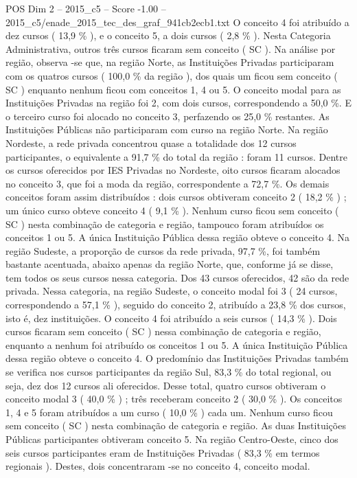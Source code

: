\begin{textsample}{POS Dim 2 – 2015\_c5 – Score -1.00 – 2015\_c5/enade\_2015\_tec\_des\_graf\_941cb2ecb1.txt}
O conceito 4 foi atribuído a dez cursos ( 13,9 \% ), e o conceito 5, a dois cursos ( 2,8 \% ).
Nesta Categoria Administrativa, outros três cursos ficaram sem conceito ( SC ).
Na análise por região, observa -se que, na região Norte, as Instituições Privadas participaram com os quatros cursos ( 100,0 \% da região ), dos quais um ficou sem conceito ( SC ) enquanto nenhum ficou com conceitos 1, 4 ou 5.
O conceito modal para as Instituições Privadas na região foi 2, com dois cursos, correspondendo a 50,0 \%.
E o terceiro curso foi alocado no conceito 3, perfazendo os 25,0 \% restantes.
As Instituições Públicas não participaram com curso na região Norte.
Na região Nordeste, a rede privada concentrou quase a totalidade dos 12 cursos participantes, o equivalente a 91,7 \% do total da região : foram 11 cursos.
Dentre os cursos oferecidos por IES Privadas no Nordeste, oito cursos ficaram alocados no conceito 3, que foi a moda da região, correspondente a 72,7 \%.
Os demais conceitos foram assim distribuídos : dois cursos obtiveram conceito 2 ( 18,2 \% ) ; um único curso obteve conceito 4 ( 9,1 \% ).
Nenhum curso ficou sem conceito ( SC ) nesta combinação de categoria e região, tampouco foram atribuídos os conceitos 1 ou 5.
A única Instituição Pública dessa região obteve o conceito 4.
Na região Sudeste, a proporção de cursos da rede privada, 97,7 \%, foi também bastante acentuada, abaixo apenas da região Norte, que, conforme já se disse, tem todos os seus cursos nessa categoria.
Dos 43 cursos oferecidos, 42 são da rede privada.
Nessa categoria, na região Sudeste, o conceito modal foi 3 ( 24 cursos, correspondendo a 57,1 \% ), seguido do conceito 2, atribuído a 23,8 \% dos cursos, isto é, dez instituições.
O conceito 4 foi atribuído a seis cursos ( 14,3 \% ).
Dois cursos ficaram sem conceito ( SC ) nessa combinação de categoria e região, enquanto a nenhum foi atribuído os conceitos 1 ou 5.
A única Instituição Pública dessa região obteve o conceito 4.
O predomínio das Instituições Privadas também se verifica nos cursos participantes da região Sul, 83,3 \% do total regional, ou seja, dez dos 12 cursos ali oferecidos.
Desse total, quatro cursos obtiveram o conceito modal 3 ( 40,0 \% ) ; três receberam conceito 2 ( 30,0 \% ).
Os conceitos 1, 4 e 5 foram atribuídos a um curso ( 10,0 \% ) cada um.
Nenhum curso ficou sem conceito ( SC ) nesta combinação de categoria e região.
As duas Instituições Públicas participantes obtiveram conceito 5.
Na região Centro-Oeste, cinco dos seis cursos participantes eram de Instituições Privadas ( 83,3 \% em termos regionais ).
Destes, dois concentraram -se no conceito 4, conceito modal.

\end{textsample}
